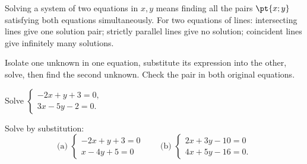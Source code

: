 \begin{keypoint}[Definition]
Solving a system of two equations in $x,y$ means finding all the pairs $\pt{x;y}$ satisfying both equations simultaneously. For two equations of lines: intersecting lines give one solution pair; strictly parallel lines give no solution; coincident lines give infinitely many solutions.
\end{keypoint}
\begin{method}[Substitution]
Isolate one unknown in one equation, substitute its expression into the other, solve, then find the second unknown. Check the pair in both original equations.
\end{method}
\begin{example}Solve $\begin{cases}-2x+y+3=0,\\3x-5y-2=0.\end{cases}$\end{example}
\begin{example}Solve by substitution:
\[\text{(a) }\begin{cases}-2x+y+3=0\\x-4y+5=0\end{cases}\qquad
\text{(b) }\begin{cases}2x+3y-10=0\\4x+5y-16=0.\end{cases}\]\end{example}

